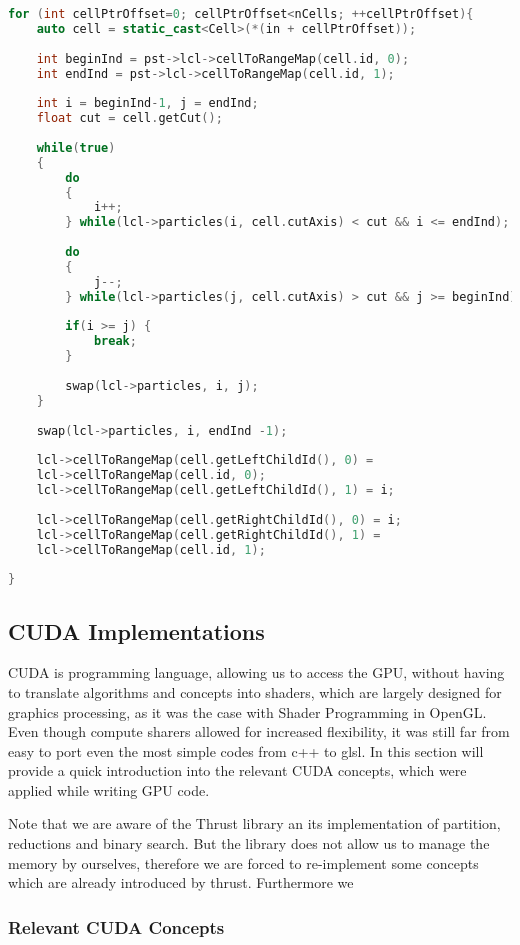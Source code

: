 \documentclass[]{article}
\begin{document}
\begin{lstlisting}[language=c++]
for (int cellPtrOffset=0; cellPtrOffset<nCells; ++cellPtrOffset){
	auto cell = static_cast<Cell>(*(in + cellPtrOffset));
	
	int beginInd = pst->lcl->cellToRangeMap(cell.id, 0);
	int endInd = pst->lcl->cellToRangeMap(cell.id, 1);
	
	int i = beginInd-1, j = endInd;
	float cut = cell.getCut();
	
	while(true)
	{
		do
		{
			i++;
		} while(lcl->particles(i, cell.cutAxis) < cut && i <= endInd);
		
		do
		{
			j--;
		} while(lcl->particles(j, cell.cutAxis) > cut && j >= beginInd);
		
		if(i >= j) {
			break;
		}
		
		swap(lcl->particles, i, j);
	}
	
	swap(lcl->particles, i, endInd -1);
	
	lcl->cellToRangeMap(cell.getLeftChildId(), 0) =
	lcl->cellToRangeMap(cell.id, 0);
	lcl->cellToRangeMap(cell.getLeftChildId(), 1) = i;
	
	lcl->cellToRangeMap(cell.getRightChildId(), 0) = i;
	lcl->cellToRangeMap(cell.getRightChildId(), 1) =
	lcl->cellToRangeMap(cell.id, 1);
	
}
\end{lstlisting}

\subsection{CUDA Implementations}

CUDA is programming language, allowing us to access the GPU, without having to translate algorithms and concepts into shaders, which are largely designed for graphics processing, as it was the case with Shader Programming in OpenGL. Even though compute sharers allowed for increased flexibility, it was still far from easy to port even the most simple codes from c++ to glsl. In this section will provide a quick introduction into the relevant CUDA concepts, which were applied while writing GPU code.

Note that we are aware of the Thrust library an its implementation of partition, reductions and binary search. But the library does not allow us to manage the memory by ourselves, therefore we are forced to re-implement some concepts which are already introduced by thrust. Furthermore we 
\subsubsection{Relevant CUDA Concepts}
\end{document}
